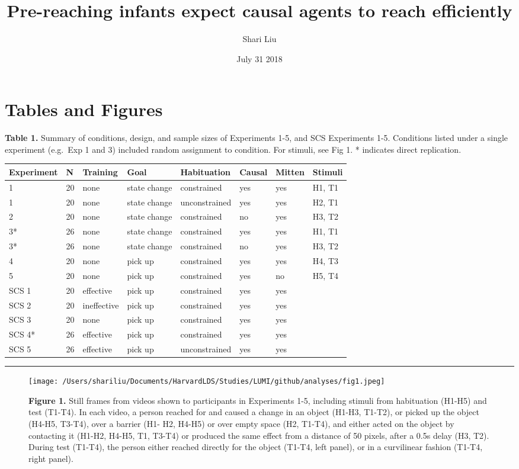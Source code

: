 \documentclass[]{article}
\title{Pre-reaching infants expect causal agents to reach efficiently}
\author{Shari Liu}
\date{July 31 2018}
\begin{document}
\maketitle

\section{Tables and Figures}\label{tables-and-figures}

\textbf{Table 1.} Summary of conditions, design, and sample sizes of
Experiments 1-5, and SCS Experiments 1-5. Conditions listed under a
single experiment (e.g.~Exp 1 and 3) included random assignment to
condition. For stimuli, see Fig 1. * indicates direct replication.

\begin{longtable}[]{@{}llllllll@{}}
\toprule
Experiment & N & Training & Goal & Habituation & Causal & Mitten &
Stimuli\tabularnewline
\midrule
\endhead
1 & 20 & none & state change & constrained & yes & yes & H1,
T1\tabularnewline
1 & 20 & none & state change & unconstrained & yes & yes & H2,
T1\tabularnewline
2 & 20 & none & state change & constrained & no & yes & H3,
T2\tabularnewline
3* & 26 & none & state change & constrained & yes & yes & H1,
T1\tabularnewline
3* & 26 & none & state change & constrained & no & yes & H3,
T2\tabularnewline
4 & 20 & none & pick up & constrained & yes & yes & H4,
T3\tabularnewline
5 & 20 & none & pick up & constrained & yes & no & H5, T4\tabularnewline
SCS 1 & 20 & effective & pick up & constrained & yes & yes
&\tabularnewline
SCS 2 & 20 & ineffective & pick up & constrained & yes & yes
&\tabularnewline
SCS 3 & 20 & none & pick up & constrained & yes & yes &\tabularnewline
SCS 4* & 26 & effective & pick up & constrained & yes & yes
&\tabularnewline
SCS 5 & 26 & effective & pick up & unconstrained & yes & yes
&\tabularnewline
\bottomrule
\end{longtable}

\begin{center}\rule{0.5\linewidth}{\linethickness}\end{center}

\begin{figure}[htbp]
\centering
\texttt{[image: /Users/shariliu/Documents/HarvardLDS/Studies/LUMI/github/analyses/fig1.jpeg]}
\caption{\textbf{Figure 1.} Still frames from videos shown to
participants in Experiments 1-5, including stimuli from habituation
(H1-H5) and test (T1-T4). In each video, a person reached for and caused
a change in an object (H1-H3, T1-T2), or picked up the object (H4-H5,
T3-T4), over a barrier (H1- H2, H4-H5) or over empty space (H2, T1-T4),
and either acted on the object by contacting it (H1-H2, H4-H5, T1,
T3-T4) or produced the same effect from a distance of 50 pixels, after a
0.5s delay (H3, T2). During test (T1-T4), the person either reached
directly for the object (T1-T4, left panel), or in a curvilinear fashion
(T1-T4, right panel).}
\end{figure}
\end{document}

